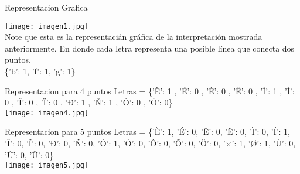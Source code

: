 \documentclass{beamer}
\begin{document}
\begin{frame}{Representacion Grafica}
\begin{multicols}{2}
\center \texttt{[image: imagen1.jpg]}
\\
\justify Note que esta es la representacián gráfica de la interpretación mostrada anteriormente. En donde cada letra representa una posible línea que conecta dos puntos.\\[15 pt]
\justify \{'b': 1, 'f': 1, 'g': 1\}\\[10 pt]

\end{multicols}
\end{frame}

\begin{frame}{Representacion para 4 puntos}
\justify Letras =  \{'È': 1 , 'É': 0 , 'Ê': 0 , 'Ë': 0 , 'Ì': 1 , 'Í': 0 , 'Î': 0 , 'Ï': 0 , 'Ð': 1 , 'Ñ': 1 , 'Ò': 0 , 'Ó': 0\}\\[15 pt]
\center \texttt{[image: imagen4.jpg]}

\end{frame}

\begin{frame}{Representacion para 5 puntos}
\justify Letras = \{'È': 1, 'É': 0, 'Ê': 0, 'Ë': 0, 'Ì': 0, 'Í': 1, 'Î': 0, 'Ï': 0, 'Ð': 0, 'Ñ': 0, 'Ò': 1, 'Ó': 0, 'Ô': 0, 'Õ': 0, 'Ö': 0, '×': 1, 'Ø': 1, 'Ù': 0, 'Ú': 0, 'Û': 0\}\\[15 pt]
\center \texttt{[image: imagen5.jpg]}
\end{frame}
\end{document}
